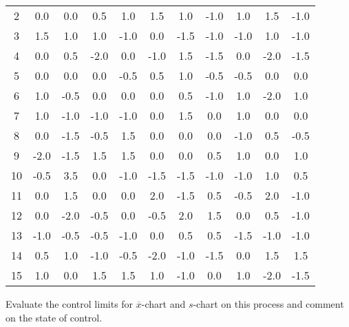 \documentclass[11pt, a4paper]{article}
\begin{document}
\begin{enumerate}
\begin{table}[h]
\begin{center}
\begin{tabular}{|c||cccccccccc|}
	2 & 0.0 & 0.0 & 0.5 & 1.0 & 1.5 & 1.0 & -1.0 & 1.0 & 1.5 & -1.0 \\
	
	3 & 1.5 & 1.0 & 1.0 & -1.0 & 0.0 & -1.5 & -1.0 & -1.0 & 1.0 & -1.0 \\
	
	4 & 0.0 & 0.5 & -2.0 & 0.0 & -1.0 & 1.5 & -1.5 & 0.0 & -2.0 & -1.5 \\
	
	5 & 0.0 & 0.0 & 0.0 & -0.5 & 0.5 & 1.0 & -0.5 & -0.5 & 0.0 & 0.0 \\
	
	6 & 1.0 & -0.5 & 0.0 & 0.0 & 0.0 & 0.5 & -1.0 & 1.0 & -2.0 & 1.0 \\
	
	7 & 1.0 & -1.0 & -1.0 & -1.0 & 0.0 & 1.5 & 0.0 & 1.0 & 0.0 & 0.0 \\
	
	8 & 0.0 & -1.5 & -0.5 & 1.5 & 0.0 & 0.0 & 0.0 & -1.0 & 0.5 & -0.5 \\
	
	9 & -2.0 & -1.5 & 1.5 & 1.5 & 0.0 & 0.0 & 0.5 & 1.0 & 0.0 & 1.0 \\
	
	10 & -0.5 & 3.5 & 0.0 & -1.0 & -1.5 & -1.5 & -1.0 & -1.0 & 1.0 & 0.5 \\
	
	11 & 0.0 & 1.5 & 0.0 & 0.0 & 2.0 & -1.5 & 0.5 & -0.5 & 2.0 & -1.0 \\
	
	12 & 0.0 & -2.0 & -0.5 & 0.0 & -0.5 & 2.0 & 1.5 & 0.0 & 0.5 & -1.0 \\
	
	13 & -1.0 & -0.5 & -0.5 & -1.0 & 0.0 & 0.5 & 0.5 & -1.5 & -1.0 & -1.0 \\
	
	14 & 0.5 & 1.0 & -1.0 & -0.5 & -2.0 & -1.0 & -1.5 & 0.0 & 1.5 & 1.5 \\
	
	15 & 1.0 & 0.0 & 1.5 & 1.5 & 1.0 & -1.0 & 0.0 & 1.0 & -2.0 & -1.5 \\
	
	\hline
	
	
	
	\end{tabular}
	\end{center}
	
	\end{table}
	
	Evaluate the control limits for $\overline{x}$-chart and $s$-chart on this process and comment on the state of control.
	

\end{enumerate}
\end{document}
